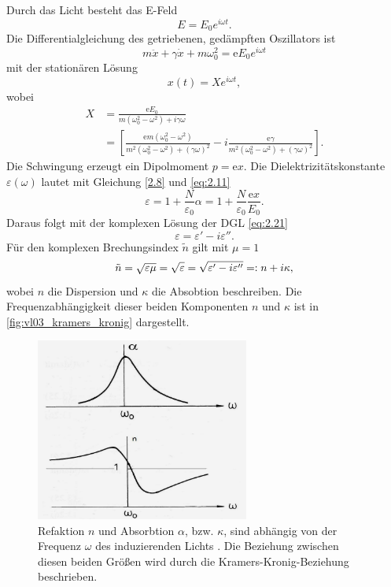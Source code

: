 	Durch das Licht besteht das E-Feld
	$$
	E = E_0 e^{i \omega t}.
	$$
	Die Differentialgleichung des getriebenen, gedämpften Oszillators ist
	\begin{equation}
		\label{2.19}
		m \ddot{x} + \gamma \dot{x} + m \omega_0^2 = \mathrm{e} E_0 e^{i \omega t}
	\end{equation}
	mit der stationären Lösung 
	$$
	x\left( t \right) = X e^{i \omega t},
	$$
	wobei
	\begin{align}
		{X} &= \frac{ \mathrm{e} E_0}{ m \left( \omega_0^2-  \omega^2 \right) + i \gamma \omega}\\
		\label{eq:2.21}
		&= \left[ \frac{\mathrm{e} m\left( \omega_0^2 - \omega^2 \right) }{ m^2 \left( \omega_0^2 - \omega^2 \right) + \left( \gamma \omega \right) ^2} -i \frac{\mathrm{e} \gamma }{m^2\left( \omega_0^2 - \omega^2 \right) + \left( \gamma \omega \right) ^2} \right].
	\end{align}
	Die Schwingung erzeugt ein Dipolmoment $p = \mathrm{e}x$. Die Dielektrizitätskonstante $ \varepsilon\left( \omega \right) $ lautet mit Gleichung \eqref{2.8} und \eqref{eq:2.11}
	\begin{equation}
		\label{eq:2.22}
		\varepsilon = 1 + \frac{N}{ \varepsilon_0} \alpha = 1 + \frac{N}{ \varepsilon_0} \frac{\mathrm{e}x}{E_0}.
	\end{equation}
	Daraus folgt mit der komplexen Lösung der DGL \eqref{eq:2.21}
	\begin{equation}
		\varepsilon = \varepsilon' - i \varepsilon''.
	\end{equation}
	Für den komplexen Brechungsindex $\tilde n$ gilt mit $\mu=1$
	\begin{equation}
		\Tilde{n} = \sqrt{ \varepsilon \mu}  = \sqrt{ \varepsilon} = \sqrt{ \varepsilon' - i \varepsilon''} =: n + i \kappa,
	\end{equation}
	wobei $n$ die Dispersion und $ \kappa$ die Absobtion beschreiben. Die Frequenzabhängigkeit dieser beiden Komponenten $n$ und $\kappa$ ist in \autoref{fig:vl03_kramers_kronig} dargestellt.\\
	\begin{figure}[H]
	\centering
		\includegraphics[width=7cm]{figures/vl03/vl03_brechungsindex_kramers_kronig.png}
		\caption{Refaktion $n$ und Absorbtion $\alpha$, bzw. $\kappa$, sind abhängig von der Frequenz $\omega$ des induzierenden Lichts \cite{Haken_Wolf_2006}. Die Beziehung zwischen diesen beiden Größen wird durch die Kramers-Kronig-Beziehung beschrieben.}
		\label{fig:vl03_kramers_kronig}
	\end{figure}

